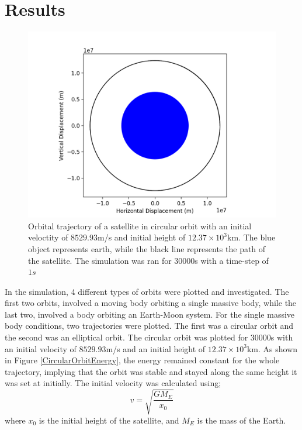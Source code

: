 \documentclass[twocolumn, prl, nobalancelastpage, aps, citeautoscript, longbibliography, 10pt]{revtex4-1}
\begin{document}
\section{Results}
\begin{figure}[h!]
\includegraphics[width = 0.96\linewidth]{CircularOrbit2d.png}
\caption{Orbital trajectory of a satellite in circular orbit with an initial veloctity of $8529.93$m/s and initial height of $12.37\times10^3$km. The blue object represents
earth, while the black line represents the path of the satellite. The simulation was ran for $30000$s with a time-step of $1s$ }
\label{CircularOrbit}
\end{figure}
In the simulation, 4 different types of orbits were plotted and investigated. The first two orbits, involved a moving body orbiting a single massive body, while the last two, involved
a body orbiting an Earth-Moon system. For the single massive body conditions, two trajectories were plotted. The first was a circular orbit and the second was an elliptical
orbit. The circular orbit was plotted for $30000$s with an initial velocity of $8529.93$m/s and an initial height of $12.37\times10^3$km. As shown in Figure \ref{CircularOrbitEnergy}, 
the energy remained constant for the whole trajectory, implying that the orbit was stable and stayed along the same height it was set at initially. The initial velocity 
was calculated using;
\begin{equation}
    v = \sqrt{\frac{G M_E}{x_0}}
\end{equation}
where $x_0$ is the initial height of the satellite, and $M_E$ is the mass of the Earth.
\end{document}
